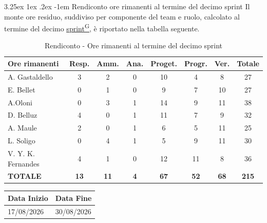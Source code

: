 \documentclass[a4paper,12pt]{article}
\makeatletter
\newcounter{subsubsubsection}[subsubsection]
\renewcommand\paragraph{\@startsection{paragraph}{5}{\z@}%
  {3.25ex \@plus1ex \@minus.2ex}%
  {-1em}%
  {\normalfont\normalsize\bfseries}}
\providecommand{\glslink}[2]{\href{https://alittlebyte-19.github.io/Documentazione/glossario.html\#gls-#1}{\underline{#2}\textsuperscript{\scriptsize G}}}
\makeatother
\begin{document}
\paragraph{Rendiconto ore rimanenti al termine del decimo sprint}
Il monte ore residuo, suddiviso per componente del team e ruolo, calcolato al termine del decimo \glslink{sprint}{sprint}, è riportato nella tabella seguente.
\begin{table}[htbp]
\centering
\renewcommand{\arraystretch}{1.5}
\begin{tabularx}{\textwidth}{|X|c|c|c|c|c|c|c|}
\hline
\textbf{Ore rimanenti} & \textbf{Resp.} & \textbf{Amm.} & \textbf{Ana.} & \textbf{Proget.} & \textbf{Progr.} & \textbf{Ver.} & \textbf{Totale} \\
\hline
A. Gastaldello & 3 & 2 & 0 & 10 & 4 & 8 & 27 \\
\hline
E. Bellet & 0 & 1 & 0 & 9 & 7 & 10 & 27 \\
\hline
A.Oloni & 0 & 3 & 1 & 14 & 9 & 11 & 38 \\
\hline
D. Belluz & 4 & 0 & 1 & 11 & 7 & 9 & 32 \\
\hline
A. Maule & 2 & 0 & 1 & 6 & 5 & 11 & 25 \\
\hline
L. Soligo & 0 & 4 & 1 & 5 & 9 & 11 & 30 \\
\hline
V. Y. K. Fernandes & 4 & 1 & 0 & 12 & 11 & 8 & 36 \\
\hline
\rowcolor{gray!20}
\textbf{TOTALE} & \textbf{13} & \textbf{11} & \textbf{4} & \textbf{67} & \textbf{52} & \textbf{68} & \textbf{215} \\
\hline
\end{tabularx}
\caption{Rendiconto - Ore rimanenti al termine del decimo sprint}
\end{table}


\newpage


\label{sec:pb_undicesimoperiodo}
\begin{table}[H]
    \centering
    \renewcommand{\arraystretch}{1.5}
    \begin{tabularx}{\textwidth}{|X|X|}
    \hline \rowcolor{Dandelion!50}
    \textbf{Data Inizio} & \textbf{Data Fine}\\
    \hline
    17/08/2026 & 30/08/2026\\
    \hline

    \end{tabularx}
\end{table}
\end{document}

